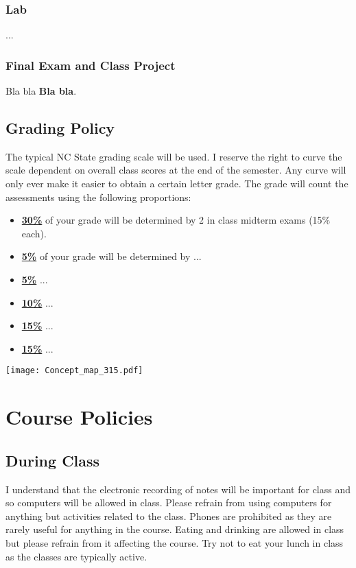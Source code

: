\documentclass[11pt]{article}
\begin{document}
\subsubsection*{Lab}
...

\subsubsection*{Final Exam and Class Project}

Bla bla \textbf{Bla bla}.

\subsection*{Grading Policy}
The typical NC State grading scale will be used. I reserve the right to curve the scale dependent on overall class scores at the end of the semester. Any curve will only ever make it easier to obtain a certain letter grade. The grade will count the assessments using the following proportions:
\begin{itemize}
	\item \underline{\textbf{30\%}} of your grade will be determined by 2 in class midterm exams (15\% each).
	\item \underline{\textbf{5\%}} of your grade will be determined by ...
	\item \underline{\textbf{5\%}} ...
    \item \underline{\textbf{10\%}}  ...
	\item \underline{\textbf{15\%}} ...
	\item \underline{\textbf{15\%}} ...
\end{itemize}


\begin{figure*}
\texttt{[image: Concept\_map\_315.pdf]}
\end{figure*}


\newpage
\section*{Course Policies}

\subsection*{During Class}
\footnotesize{I understand that the electronic recording of notes will be important for class and so computers will be allowed in class. Please refrain from using computers for anything but activities related to the class. Phones are prohibited as they are rarely useful for anything in the course. Eating and drinking are allowed in class but please refrain from it affecting the course. Try not to eat your lunch in class as the classes are typically active.}
\end{document}
